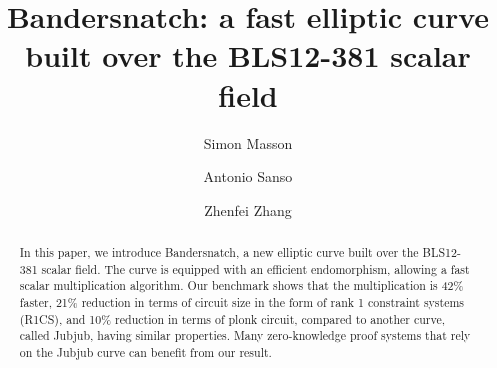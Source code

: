 \documentclass[smallextended]{svjour3}
\begin{document}
\title{Bandersnatch: a fast elliptic curve built over the BLS12-381
  scalar field}
\author{ Simon Masson  \and Antonio Sanso   \and Zhenfei Zhang 
}


\date{}

\makeatletter
\newcommand{\verbatimfont}[1]{\renewcommand{\verbatim@font}{\ttfamily#1}}
\makeatother

\maketitle

\verbatimfont{\small}%

\begin{abstract}
 In this paper, we introduce Bandersnatch, a new elliptic curve
 built over the BLS12-381 scalar field. The curve is equipped with an efficient
 endomorphism, allowing a fast scalar multiplication algorithm.
 Our benchmark shows that the multiplication is 42\% faster, 
 21\% reduction in terms of circuit size in the 
 form of rank 1 constraint systems (R1CS), 
 and 10\% reduction in terms of plonk circuit,
 compared to another curve, called Jubjub, having similar
 properties. Many zero-knowledge proof systems that rely on
 the Jubjub curve can benefit
 from our result.
\end{abstract}

\\
\end{document}
